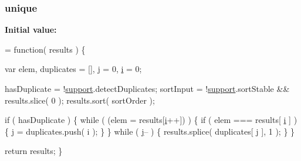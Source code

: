 \subsubsection[{unique}]{ unique}\label{jquery-1_810_82-vsdoc_8js_a55d5adf9da69a81b8295f6bedfc34f60}
{\bfseries Initial value\+:}
\begin{DoxyCode}
= \textcolor{keyword}{function}( results ) \{


    var elem,
        duplicates = [],
        \hyperlink{_bibabook_2_scripts_2jquery_8validate_8unobtrusive_8min_8js_a5f7d9fc7ba35dc513eb3080d74d27476}{j} = 0,
        \hyperlink{_bibabook_2_scripts_2respond_8min_8js_a5e25b1d1bed9ab5f3174b76d6a722180}{i} = 0;

    
    hasDuplicate = !\hyperlink{jquery-1_810_82-vsdoc_8js_a1be69652377630fc5432ae5ec6463744}{support}.detectDuplicates;
    sortInput = !\hyperlink{jquery-1_810_82-vsdoc_8js_a1be69652377630fc5432ae5ec6463744}{support}.sortStable && results.slice( 0 );
    results.sort( sortOrder );

    \textcolor{keywordflow}{if} ( hasDuplicate ) \{
        \textcolor{keywordflow}{while} ( (elem = results[\hyperlink{_bibabook_2_scripts_2respond_8min_8js_a5e25b1d1bed9ab5f3174b76d6a722180}{i}++]) ) \{
            \textcolor{keywordflow}{if} ( elem === results[ \hyperlink{_bibabook_2_scripts_2respond_8min_8js_a5e25b1d1bed9ab5f3174b76d6a722180}{i} ] ) \{
                \hyperlink{_bibabook_2_scripts_2jquery_8validate_8unobtrusive_8min_8js_a5f7d9fc7ba35dc513eb3080d74d27476}{j} = duplicates.push( i );
            \}
        \}
        \textcolor{keywordflow}{while} ( \hyperlink{_bibabook_2_scripts_2jquery_8validate_8unobtrusive_8min_8js_a5f7d9fc7ba35dc513eb3080d74d27476}{j}-- ) \{
            results.splice( duplicates[ \hyperlink{_bibabook_2_scripts_2jquery_8validate_8unobtrusive_8min_8js_a5f7d9fc7ba35dc513eb3080d74d27476}{j} ], 1 );
        \}
    \}

    \textcolor{keywordflow}{return} results;
\}
\end{DoxyCode}
\hypertarget{jquery-1_810_82-vsdoc_8js_ae048eb914220ef1a45b8cef8fbf97041}{}

